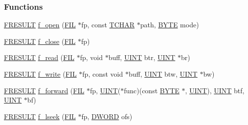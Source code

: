 \subsubsection*{Functions}
\begin{DoxyCompactItemize}
\item 
\hyperlink{ff_8h_a49d0171ecbd362cda5680a0d360db44c}{F\+R\+E\+S\+U\+L\+T} \hyperlink{ff_8h_aefdef7126128d99d0b3bd82c28e54d80}{f\+\_\+open} (\hyperlink{struct_f_i_l}{F\+I\+L} $\ast$fp, const \hyperlink{ff_8h_a03bdb8ce5895c7e261aadc2529637546}{T\+C\+H\+A\+R} $\ast$path, \hyperlink{integer_8h_a4ae1dab0fb4b072a66584546209e7d58}{B\+Y\+T\+E} mode)
\item 
\hyperlink{ff_8h_a49d0171ecbd362cda5680a0d360db44c}{F\+R\+E\+S\+U\+L\+T} \hyperlink{ff_8h_a53882db20ef4323dcfd1874d7733ffc3}{f\+\_\+close} (\hyperlink{struct_f_i_l}{F\+I\+L} $\ast$fp)
\item 
\hyperlink{ff_8h_a49d0171ecbd362cda5680a0d360db44c}{F\+R\+E\+S\+U\+L\+T} \hyperlink{ff_8h_ac4c3dcb6869ca252888eebabe39727b3}{f\+\_\+read} (\hyperlink{struct_f_i_l}{F\+I\+L} $\ast$fp, void $\ast$buff, \hyperlink{integer_8h_a36cb3b01d81ffd844bbbfb54003e06ec}{U\+I\+N\+T} btr, \hyperlink{integer_8h_a36cb3b01d81ffd844bbbfb54003e06ec}{U\+I\+N\+T} $\ast$br)
\item 
\hyperlink{ff_8h_a49d0171ecbd362cda5680a0d360db44c}{F\+R\+E\+S\+U\+L\+T} \hyperlink{ff_8h_ae6a4dfae8a9e308bdb2283a37ef680f2}{f\+\_\+write} (\hyperlink{struct_f_i_l}{F\+I\+L} $\ast$fp, const void $\ast$buff, \hyperlink{integer_8h_a36cb3b01d81ffd844bbbfb54003e06ec}{U\+I\+N\+T} btw, \hyperlink{integer_8h_a36cb3b01d81ffd844bbbfb54003e06ec}{U\+I\+N\+T} $\ast$bw)
\item 
\hyperlink{ff_8h_a49d0171ecbd362cda5680a0d360db44c}{F\+R\+E\+S\+U\+L\+T} \hyperlink{ff_8h_a6c0c4cd695704aa6d952c90be81d9849}{f\+\_\+forward} (\hyperlink{struct_f_i_l}{F\+I\+L} $\ast$fp, \hyperlink{integer_8h_a36cb3b01d81ffd844bbbfb54003e06ec}{U\+I\+N\+T}($\ast$func)(const \hyperlink{integer_8h_a4ae1dab0fb4b072a66584546209e7d58}{B\+Y\+T\+E} $\ast$, \hyperlink{integer_8h_a36cb3b01d81ffd844bbbfb54003e06ec}{U\+I\+N\+T}), \hyperlink{integer_8h_a36cb3b01d81ffd844bbbfb54003e06ec}{U\+I\+N\+T} btf, \hyperlink{integer_8h_a36cb3b01d81ffd844bbbfb54003e06ec}{U\+I\+N\+T} $\ast$bf)
\item 
\hyperlink{ff_8h_a49d0171ecbd362cda5680a0d360db44c}{F\+R\+E\+S\+U\+L\+T} \hyperlink{ff_8h_a5df0ac672ada972e89ef4b003e57f964}{f\+\_\+lseek} (\hyperlink{struct_f_i_l}{F\+I\+L} $\ast$fp, \hyperlink{integer_8h_ad342ac907eb044443153a22f964bf0af}{D\+W\+O\+R\+D} ofs)

\end{DoxyCompactItemize}
